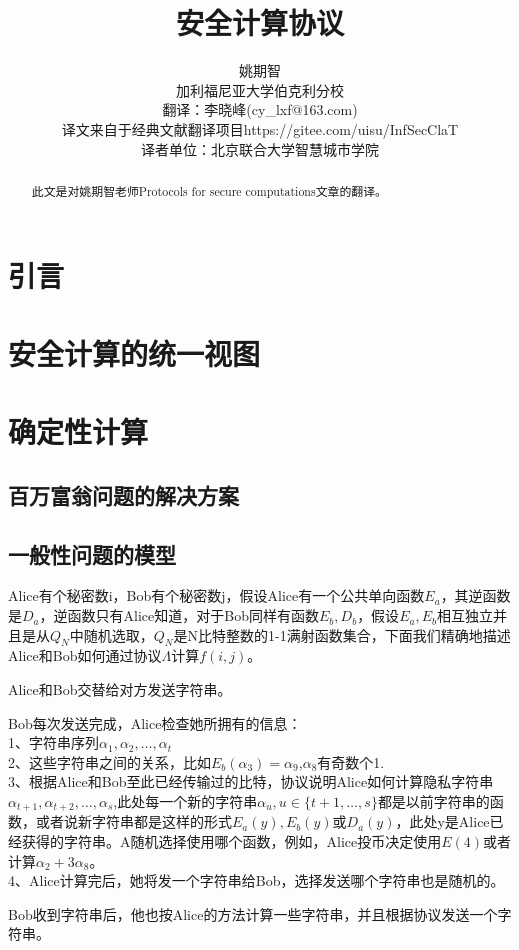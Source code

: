 \documentclass[]{article}
\title{安全计算协议}
\author{姚期智\\
	加利福尼亚大学伯克利分校\\
{\small  翻译：李晓峰(cy\_lxf@163.com)}\\
{\small  译文来自于经典文献翻译项目https://gitee.com/uisu/InfSecClaT}\\
{\small 译者单位：北京联合大学智慧城市学院}
}
\begin{document}
	
	\maketitle
	
	\begin{abstract}
		此文是对姚期智老师Protocols for secure computations文章的翻译。
	\end{abstract}
	
	\section{引言}
	
	\section{安全计算的统一视图}
	
	\section{确定性计算}
	\subsection{百万富翁问题的解决方案}
	\subsection{一般性问题的模型}
	Alice有个秘密数i，Bob有个秘密数j，假设Alice有一个公共单向函数$E_a$，其逆函数是$D_a$，逆函数只有Alice知道，对于Bob同样有函数$E_b,D_b$，假设$E_a,E_b$相互独立并且是从$Q_N$中随机选取，$Q_N$是N比特整数的1-1满射函数集合，下面我们精确地描述Alice和Bob如何通过协议$\Lambda$计算$f(i,j)$。\par
	Alice和Bob交替给对方发送字符串。\par
	Bob每次发送完成，Alice检查她所拥有的信息：\\
	1、字符串序列$\alpha_1,\alpha_2,\ldots,\alpha_t$\\
	2、这些字符串之间的关系，比如$E_b(\alpha_3)=\alpha_9$,$\alpha_8$有奇数个1.\\
	3、根据Alice和Bob至此已经传输过的比特，协议说明Alice如何计算隐私字符串$\alpha_{t+1},\alpha_{t+2},\ldots,\alpha_s$,此处每一个新的字符串$\alpha_u,u\in \{t+1,\ldots,s\}$都是以前字符串的函数，或者说新字符串都是这样的形式$E_a(y),E_b(y)$或$D_a(y)$，此处y是Alice已经获得的字符串。A随机选择使用哪个函数，例如，Alice投币决定使用$E(4)$或者计算$\alpha_2+3\alpha_8$。\\
	4、Alice计算完后，她将发一个字符串给Bob，选择发送哪个字符串也是随机的。\par
	Bob收到字符串后，他也按Alice的方法计算一些字符串，并且根据协议发送一个字符串。\par
	
\end{document}
